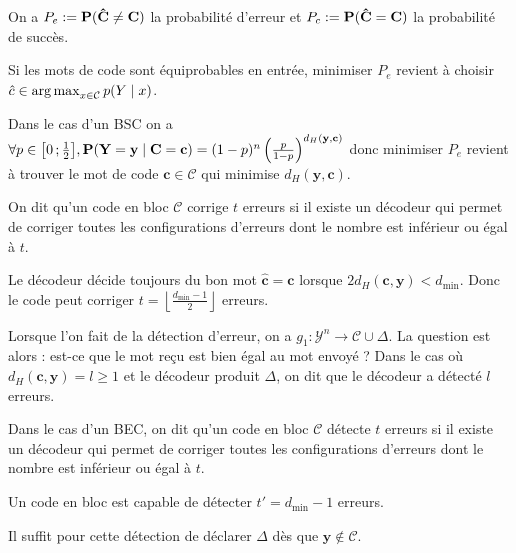 	On a $P_e := \mathbf{P}(\mathbf{\hat{C}} \neq \mathbf{C})$ la probabilité d'erreur et $P_c := \mathbf{P}(\mathbf{\hat{C}} = \mathbf{C})$ la probabilité de succès.

	\begin{pop}
		Si les mots de code sont équiprobables en entrée, minimiser $P_e$ revient à choisir $\hat{c} \in \operatorname{arg\, max}_{x \in \mathcal{C}} p(Y \mid x)$.
	\end{pop}

	\begin{pop}
		Dans le cas d'un BSC on a
		$\forall p \in \mathopen{}\mathclose{\left[0\mathclose{}\mathpunct{};\frac{1}{2}\right]}, \mathbf{P}(\mathbf{Y} = \mathbf{y} \mid \mathbf{C} = \mathbf{c}) = (1 - p)^n \left( \frac{p}{1 - p} \right)^{d_H(\mathbf{y},\mathbf{c})}$
		donc minimiser $P_e$ revient à trouver le mot de code $\mathbf{c} \in \mathcal{C}$ qui minimise $d_H(\mathbf{y},\mathbf{c})$.
	\end{pop}

	\begin{voc}
		On dit qu'un code en bloc $\mathcal{C}$ corrige $t$ erreurs si il existe un décodeur qui permet de corriger toutes les configurations d'erreurs dont le nombre est inférieur ou égal à $t$.
	\end{voc}

	\begin{pop}
		Le décodeur décide toujours du bon mot $\mathbf{\hat{c}} = \mathbf{c}$ lorsque $2 d_H(\mathbf{c},\mathbf{y}) < d_{\min}$.
		Donc le code peut corriger $t = \left\lfloor \frac{d_{\min} - 1}{2} \right\rfloor$ erreurs.
	\end{pop}

	Lorsque l'on fait de la détection d'erreur, on a $g_1 \colon \mathcal{Y}^n \to \mathcal{C} \cup \Delta$.
	La question est alors : est-ce que le mot reçu est bien égal au mot envoyé ?
	Dans le cas où $d_H(\mathbf{c},\mathbf{y}) = l \geq 1$ et le décodeur produit $\Delta$, on dit que le décodeur a détecté $l$ erreurs.

	\begin{voc}
		Dans le cas d'un BEC, on dit qu'un code en bloc $\mathcal{C}$ détecte $t$ erreurs si il existe un décodeur qui permet de corriger toutes les configurations d'erreurs dont le nombre est inférieur ou égal à $t$.
	\end{voc}

	\begin{pop}
		Un code en bloc est capable de détecter $t' = d_{\min} - 1$ erreurs.
	\end{pop}
	Il suffit pour cette détection de déclarer $\Delta$ dès que $\mathbf{y} \not\in \mathcal{C}$.


